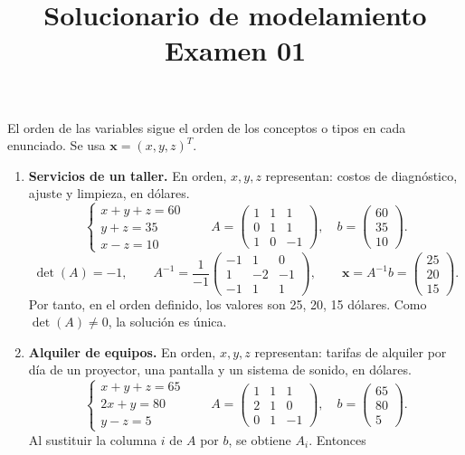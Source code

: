 \documentclass[11pt,a4paper]{article}
\title{\textbf{Solucionario de modelamiento\\Examen 01}}
\author{}
\date{}
\begin{document}
\maketitle
El orden de las variables sigue el orden de los conceptos o tipos en cada enunciado. Se usa $\mathbf{x}=(x,y,z)^T$.
\begin{enumerate}
\item \textbf{Servicios de un taller.} En orden, $x,y,z$ representan: costos de diagnóstico, ajuste y limpieza, en dólares.
\[\begin{cases}x+y+z=60\\y+z=35\\x-z=10\end{cases}\qquad A=\begin{pmatrix}1&1&1\\0&1&1\\1&0&-1\end{pmatrix},\quad b=\begin{pmatrix}60\\35\\10\end{pmatrix}.\]
\[\det(A)=-1,\qquad A^{-1}=\frac{1}{-1}\begin{pmatrix}-1&1&0\\1&-2&-1\\-1&1&1\end{pmatrix},\qquad \mathbf{x}=A^{-1}b=\begin{pmatrix}25\\20\\15\end{pmatrix}.\]
Por tanto, en el orden definido, los valores son 25, 20, 15 dólares. Como $\det(A)\ne0$, la solución es única.
\item \textbf{Alquiler de equipos.} En orden, $x,y,z$ representan: tarifas de alquiler por día de un proyector, una pantalla y un sistema de sonido, en dólares.
\[\begin{cases}x+y+z=65\\2x+y=80\\y-z=5\end{cases}\qquad A=\begin{pmatrix}1&1&1\\2&1&0\\0&1&-1\end{pmatrix},\quad b=\begin{pmatrix}65\\80\\5\end{pmatrix}.\]
Al sustituir la columna $i$ de $A$ por $b$, se obtiene $A_i$. Entonces

\end{enumerate}
\end{document}
